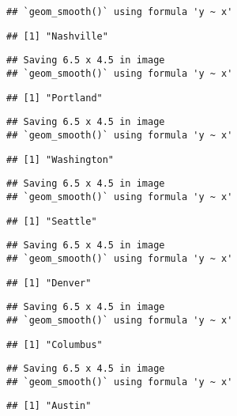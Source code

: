 \documentclass[
]{article}
\begin{document}
\begin{verbatim}
## `geom_smooth()` using formula 'y ~ x'
\end{verbatim}

\begin{verbatim}
## [1] "Nashville"
\end{verbatim}

\begin{verbatim}
## Saving 6.5 x 4.5 in image
## `geom_smooth()` using formula 'y ~ x'
\end{verbatim}

\begin{verbatim}
## [1] "Portland"
\end{verbatim}

\begin{verbatim}
## Saving 6.5 x 4.5 in image
## `geom_smooth()` using formula 'y ~ x'
\end{verbatim}

\begin{verbatim}
## [1] "Washington"
\end{verbatim}

\begin{verbatim}
## Saving 6.5 x 4.5 in image
## `geom_smooth()` using formula 'y ~ x'
\end{verbatim}

\begin{verbatim}
## [1] "Seattle"
\end{verbatim}

\begin{verbatim}
## Saving 6.5 x 4.5 in image
## `geom_smooth()` using formula 'y ~ x'
\end{verbatim}

\begin{verbatim}
## [1] "Denver"
\end{verbatim}

\begin{verbatim}
## Saving 6.5 x 4.5 in image
## `geom_smooth()` using formula 'y ~ x'
\end{verbatim}

\begin{verbatim}
## [1] "Columbus"
\end{verbatim}

\begin{verbatim}
## Saving 6.5 x 4.5 in image
## `geom_smooth()` using formula 'y ~ x'
\end{verbatim}

\begin{verbatim}
## [1] "Austin"
\end{verbatim}
\end{document}
